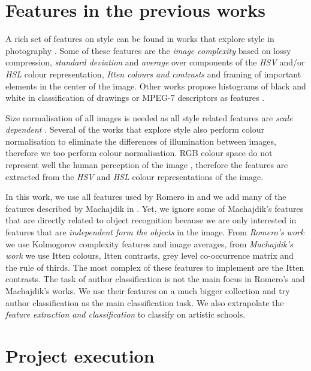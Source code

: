 \documentclass[11pt,a4paper,twoside,openright]{report}
\begin{document}
\section{Features in the previous works}

A rich set of features on style can be found in works that explore style in
photography \cite{jma12clas,cmrc13fs,rmc12ajs,mach10clas}.  Some of these
features are the \emph{image complexity} based on lossy compression,
\emph{standard deviation} and \emph{average} over components of the \emph{HSV}
and/or \emph{HSL} colour representation, \emph{Itten colours and contrasts} and
framing of important elements in the center of the image.  Other works propose
histograms of black and white in classification of drawings \cite{kroner98draw}
or MPEG-7 descriptors as features \cite{isv12mpeg}.

Size normalisation of all images is needed as all style related features are
\emph{scale dependent} \cite{jma12clas,mach10clas}.  Several of the works that
explore style \cite{jma12clas,cmrc13fs,rmc12ajs} also perform colour
normalisation to eliminate the differences of illumination between images,
therefore we too perform colour normalisation.  RGB colour space do not
represent well the human perception of the image \cite{mach10clas}, therefore
the features are extracted from the \emph{HSV} and \emph{HSL} colour
representations of the image.

In this work, we use all features used by Romero in \cite{rmc12ajs} and we add
many of the features described by Machajdik in \cite{mach10clas}.  Yet, we
ignore some of Machajdik's features that are directly related to object
recognition because we are only interested in features that are
\emph{independent form the objects} in the image.  From \emph{Romero's work} we
use Kolmogorov complexity features and image averages, from \emph{Machajdik's
work} we use Itten colours, Itten contrasts, grey level co-occurrence matrix
and the rule of thirds.  The most complex of these features to implement are
the Itten contrasts.  The task of author classification is not the main focus
in Romero's and Machajdik's works.  We use their features on a much bigger
collection and try author classification as the main classification task.  We
also extrapolate the \emph{feature extraction and classification} to classify
on artistic schools.

\section{Project execution}
\end{document}
